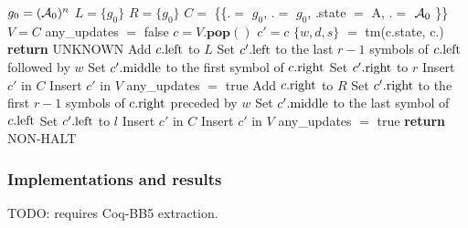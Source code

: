 \begin{algorithm}
\begin{algorithmic}[1]
        \State $g_0 = (\mathcal{A}_0)^n$ 
        \State $L = \{ g_0 \}$ 
        \State $R = \{ g_0 \}$ 
        \State $C =$ \{\{.\leftngram $=$ $g_0$, .\rightngram $=$ $g_0$, .state $=$ \textcolor{colorA}{A}, .\middlesymbol $=$ $\mathcal{A}_0$ \}\} 
        \label{alg:NGramCPS:line:whileTrue}
        \State $V = C$
        \State any\_updates $=$ false
        \State $c = V.\textbf{pop}()$
        \State $c' = c$
        \State $\{w,d,s\}$ $=$ tm(c.state, c.\middlesymbol) 
        \State {} 
        \State \textbf{return} UNKNOWN\label{alg:NGramCPS:line:unknown}
        \EndIf
        \State {}
        \State Add $c.\text{left}$ to $L$ \label{alg:NGramCPS:line:insertL}
        \State Set $c'.\text{left}$ to the last $r-1$ symbols of $c.\text{left}$ followed by $w$
        \State Set $c'.\text{middle}$ to the first symbol of $c.\text{right}$
        \State Set $c'.\text{right}$ to $r$
        \State \tabi Insert $c'$ in $C$ \label{alg:NGramCPS:line:insertInConfSet}
        \State \tabi Insert $c'$ in $V$ \label{alg:NGramCPS:line:insertInConfSetToVisit}
        \State \tabi any\_updates $=$ true
        \EndIf
        \EndFor
        \EndIf
        \State {} \label{alg:NGramCPS:line:moveLeft}
        \State Add $c.\text{right}$ to $R$
        \State Set $c'.\text{right}$ to the first $r-1$ symbols of $c.\text{right}$ preceded by $w$
        \State Set $c'.\text{middle}$ to the last symbol of $c.\text{left}$
        \State Set $c'.\text{left}$ to $l$
        \State \tabi Insert $c'$ in $C$
        \State \tabi Insert $c'$ in $V$
        \State \tabi any\_updates $=$ true
        \EndIf
        \EndFor
        \EndIf
        \EndWhile
        \State {}
        \State \textbf{return} NON-HALT\label{alg:NGramCPS:line:non-halt} 
        \EndIf

        \EndWhile
    \end{algorithmic}
\end{algorithm}

\subsubsection{Implementations and results}\label{sec:n-gramCPS:results}
TODO: requires Coq-BB5 extraction.